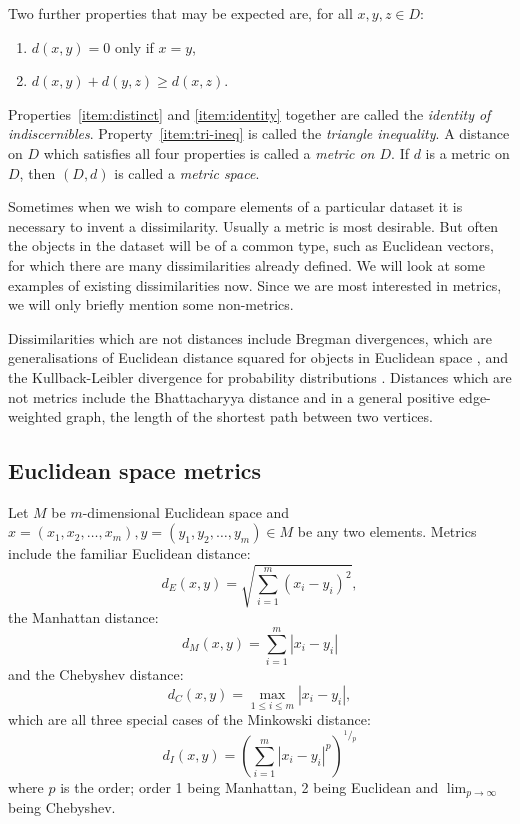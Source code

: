 \documentclass[a4paper]{report}
\newcommand{\dset}{D}
\newcommand{\prettyfrac}[2]{^#1\!/\!_#2}
\begin{document}
Two further properties that may be expected are, for all $x,y,z \in \dset$:
\begin{enumerate}[resume]
\item \label{item:identity} $d(x,y) = 0$ only if $x=y$,
\item \label{item:tri-ineq} $d(x,y)+d(y,z) \geq d(x,z)$.
\end{enumerate}
Properties~\ref{item:distinct} and \ref{item:identity} together are called the
\textit{identity of indiscernibles}.  Property~\ref{item:tri-ineq} is called
the \textit{triangle inequality}.  A distance on $\dset$ which satisfies all
four properties is called a \textit{metric on $\dset$}.  If $d$ is a metric on
$\dset$, then $(\dset,d)$ is called a \textit{metric space}.

Sometimes when we wish to compare elements of a particular dataset it is
necessary to invent a dissimilarity.  Usually a metric is most desirable.  But
often the objects in the dataset will be of a common type, such as Euclidean
vectors, for which there are many dissimilarities already defined.  We will
look at some examples of existing dissimilarities now.  Since we are most
interested in metrics, we will only briefly mention some non-metrics.

Dissimilarities which are not distances include Bregman divergences, which are
generalisations of Euclidean distance squared for objects in Euclidean space
\citep{banerjee2005clustering}, and the Kullback-Leibler divergence for
probability distributions \citep{kullback68information}.  Distances which are
not metrics include the Bhattacharyya distance \citep{bhattacharyya43distance}
and in a general positive edge-weighted graph, the length of the shortest path
between two vertices.

\subsection{Euclidean space metrics}
\label{sec:eucl-space-metr}

Let $M$ be $m$-dimensional Euclidean space and $x=(x_1,x_2,\dotsc,x_m),
y=(y_1,y_2,\dotsc,y_m) \in M$ be any two elements.  Metrics include the
familiar Euclidean distance:
\begin{equation*}
  d_E(x,y) = \sqrt{\sum_{i=1}^{m} (x_i - y_i)^2},
\end{equation*}
the Manhattan distance:
\begin{equation*}
  d_{M}(x,y) = \sum_{i=1}^{m} |x_i - y_i|
\end{equation*}
and the Chebyshev distance:
\begin{equation*}
  d_C(x,y) = \max_{1 \leq i \leq m} |x_i - y_i|,
\end{equation*}
which are all three special cases of the Minkowski distance:
\begin{equation*}
  d_{I}(x,y) = \left(\sum_{i=1}^{m} |x_i - y_i|^{p}\right)^{\prettyfrac{1}{p}}
\end{equation*}
where $p$ is the order; order 1 being Manhattan, 2 being Euclidean and
$\lim_{p \to \infty}$ being Chebyshev.
\end{document}
